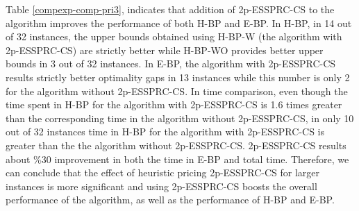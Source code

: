 Table \ref{compexp-comp-pri3}, indicates that addition of  2p-ESSPRC-CS to the algorithm
improves the performance of both H-BP and E-BP. In H-BP, in
14 out of 32 instances, the upper bounds obtained using H-BP-W (the algorithm with
2p-ESSPRC-CS) are strictly better while H-BP-WO
provides better upper bounds in 3 out of 32 instances. In E-BP, the algorithm with
2p-ESSPRC-CS results strictly better optimality gaps in 13 instances while this number
is only 2 for the algorithm without 2p-ESSPRC-CS. In time comparison,
even though the time spent in H-BP for the algorithm with 2p-ESSPRC-CS is 1.6 times
greater than the corresponding time in the algorithm without 2p-ESSPRC-CS, in only 10 out of
32 instances time in H-BP for the algorithm with 2p-ESSPRC-CS is greater than the
the algorithm without 2p-ESSPRC-CS.
2p-ESSPRC-CS results about \%30 improvement in both the time in E-BP and total time.
Therefore, we can conclude that the effect of heuristic pricing 2p-ESSPRC-CS for larger
instances is more significant and using 2p-ESSPRC-CS boosts the
overall performance of the algorithm, as well as the performance of H-BP and E-BP.

